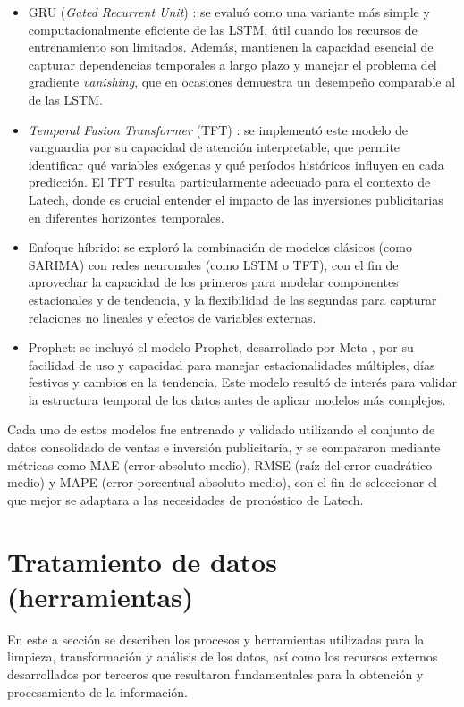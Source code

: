 \begin{itemize}
	\item GRU (\textit{Gated Recurrent Unit}) \citep{cho2014gru}: se evaluó como una variante más simple y computacionalmente eficiente de las LSTM, útil cuando los recursos de entrenamiento son limitados. Además, mantienen la capacidad esencial de capturar dependencias temporales a largo plazo y manejar el problema del gradiente \textit{vanishing}, que en ocasiones demuestra un desempeño comparable al de las LSTM.

	\item \textit{Temporal Fusion Transformer} (TFT) \citep{lim2021temporal}: se implementó este modelo de vanguardia por su capacidad de atención interpretable, que permite identificar qué variables exógenas y qué períodos históricos influyen en cada predicción. El TFT resulta particularmente adecuado para el contexto de Latech, donde es crucial entender el impacto de las inversiones publicitarias en diferentes horizontes temporales.

	\item Enfoque híbrido: se exploró la combinación de modelos clásicos (como SARIMA) con redes neuronales (como LSTM o TFT), con el fin de aprovechar la capacidad de los primeros para modelar componentes estacionales y de tendencia, y la flexibilidad de las segundas para capturar relaciones no lineales y efectos de variables externas.

	\item Prophet: se incluyó el modelo Prophet, desarrollado por Meta \citep{meta}, por su facilidad de uso y capacidad para manejar estacionalidades múltiples, días festivos y cambios en la tendencia. Este modelo resultó de interés para validar la estructura temporal de los datos antes de aplicar modelos más complejos.
	\end{itemize}

Cada uno de estos modelos fue entrenado y validado utilizando el conjunto de datos consolidado de ventas e inversión publicitaria, y se compararon mediante métricas como MAE (error absoluto medio), RMSE (raíz del error cuadrático medio) y MAPE (error porcentual absoluto medio), con el fin de seleccionar el que mejor se adaptara a las necesidades de pronóstico de Latech.


\section{Tratamiento de datos (herramientas)}

En este a sección se describen los procesos y herramientas utilizadas para la limpieza, transformación y análisis de los datos, así como los recursos externos desarrollados por terceros que resultaron fundamentales para la obtención y procesamiento de la información.





